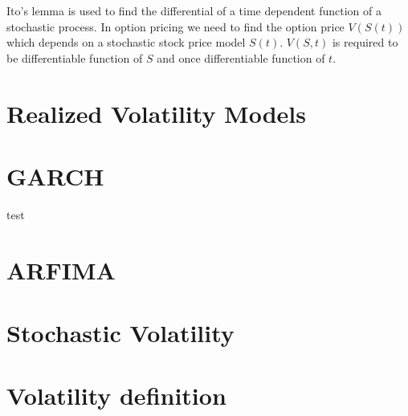 Ito's lemma is used to find the differential of a time dependent function of a stochastic process. In option pricing we need to find the option price $V(S(t))$ which depends on a stochastic stock price model $S(t)$. 
$V(S,t)$ is required to be  differentiable function of $S$ and once differentiable function of $t$.







 
\section{Realized Volatility Models}

\section{GARCH}
test
\section{ARFIMA}
\section{Stochastic Volatility}

\section{Volatility definition}


